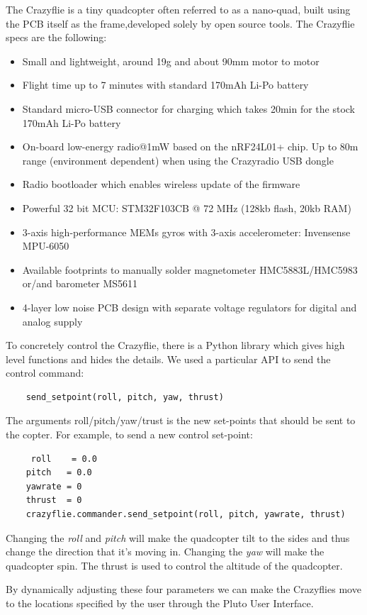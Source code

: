 The Crazyflie is a tiny quadcopter often referred to as a nano-quad, built using the PCB itself as the frame,developed solely by open source tools. The Crazyflie specs are the following:


\begin{itemize}
\item {Small and lightweight, around 19g and about 90mm motor to motor
}
\item {Flight time up to 7 minutes with standard 170mAh Li-Po battery
}
\item {Standard micro-USB connector for charging which takes 20min for the stock 170mAh Li-Po battery
}
\item {On-board low-energy radio@1mW based on the nRF24L01+ chip. Up to 80m range (environment dependent) when using the Crazyradio USB dongle}
\item{Radio bootloader which enables wireless update of the firmware
}
\item{Powerful 32 bit MCU: STM32F103CB @ 72 MHz (128kb flash, 20kb RAM)
}
\item{3-axis high-performance MEMs gyros with 3-axis accelerometer: Invensense MPU-6050
}
\item{Available footprints to manually solder magnetometer HMC5883L/HMC5983 or/and barometer MS5611
}
\item{4-layer low noise PCB design with separate voltage regulators for digital and analog supply
}
\end{itemize}

To concretely control the Crazyflie, there is a Python library which gives high level functions and hides the details.
We used a particular API to send the control command: 
\\

\begin{lstlisting}
	send_setpoint(roll, pitch, yaw, thrust)
\end{lstlisting}

The arguments roll/pitch/yaw/trust is the new set-points that should be sent to the copter.
For example, to send a new control set-point:
\\

\begin{lstlisting}
	 roll    = 0.0
    pitch   = 0.0
    yawrate = 0
    thrust  = 0
    crazyflie.commander.send_setpoint(roll, pitch, yawrate, thrust)
\end{lstlisting}

Changing the \textit{roll} and \textit{pitch} will make the quadcopter tilt to the sides and thus change the direction that it's moving in.
Changing the \textit{yaw} will make the quadcopter spin.
The thrust is used to control the altitude of the quadcopter.

By dynamically adjusting these four parameters we can make the Crazyflies move to the locations specified by the user through the Pluto User Interface.


